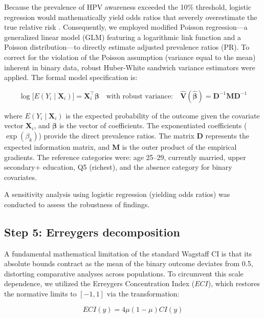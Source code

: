 Because the prevalence of HPV awareness exceeded the 10\% threshold, logistic regression would mathematically yield odds ratios that severely overestimate the true relative risk \cite{barros2003}. Consequently, we employed modified Poisson regression---a generalized linear model (GLM) featuring a logarithmic link function and a Poisson distribution---to directly estimate adjusted prevalence ratios (PR). To correct for the violation of the Poisson assumption (variance equal to the mean) inherent in binary data, robust Huber-White sandwich variance estimators were applied. The formal model specification is:

\begin{equation}
\log\bigl[E(Y_i \mid \mathbf{X}_i)\bigr] = \mathbf{X}_i^\top \boldsymbol{\beta} \quad \text{with robust variance:} \quad \widehat{\mathbf{V}}(\hat{\boldsymbol{\beta}}) = \mathbf{D}^{-1} \mathbf{M} \mathbf{D}^{-1}
\end{equation}

\noindent where $E(Y_i \mid \mathbf{X}_i)$ is the expected probability of the outcome given the covariate vector $\mathbf{X}_i$, and $\boldsymbol{\beta}$ is the vector of coefficients. The exponentiated coefficients ($\exp(\beta_k)$) provide the direct prevalence ratios. The matrix $\mathbf{D}$ represents the expected information matrix, and $\mathbf{M}$ is the outer product of the empirical gradients. The reference categories were: age 25--29, currently married, upper secondary+ education, Q5 (richest), and the absence category for binary covariates.

A sensitivity analysis using logistic regression (yielding odds ratios) was conducted to assess the robustness of findings.

\subsection{Step 5: Erreygers decomposition}

A fundamental mathematical limitation of the standard Wagstaff CI is that its absolute bounds contract as the mean of the binary outcome deviates from 0.5, distorting comparative analyses across populations. To circumvent this scale dependence, we utilized the Erreygers Concentration Index ($ECI$), which restores the normative limits to $[-1, 1]$ via the transformation:

\begin{equation}
ECI(y) = 4 \mu (1 - \mu) CI(y)
\end{equation}

